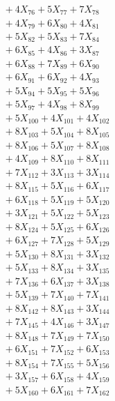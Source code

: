 \documentclass[a4paper,10pt]{article}
\begin{document}
{\begin{align}
&\;  + 4 X_{76} + 5 X_{77} + 7 X_{78} \\[0.3ex]
&\;  + 4 X_{79} + 6 X_{80} + 4 X_{81} \\[0.3ex]
&\;  + 5 X_{82} + 5 X_{83} + 7 X_{84} \\[0.3ex]
&\;  + 6 X_{85} + 4 X_{86} + 3 X_{87} \\[0.3ex]
&\;  + 6 X_{88} + 7 X_{89} + 6 X_{90} \\[0.3ex]
&\;  + 6 X_{91} + 6 X_{92} + 4 X_{93} \\[0.3ex]
&\;  + 5 X_{94} + 5 X_{95} + 5 X_{96} \\[0.3ex]
&\;  + 5 X_{97} + 4 X_{98} + 8 X_{99} \\[0.5ex]\allowbreak
&\;  + 5 X_{100} + 4 X_{101} + 4 X_{102} \\[0.3ex]
&\;  + 8 X_{103} + 5 X_{104} + 8 X_{105} \\[0.3ex]
&\;  + 8 X_{106} + 5 X_{107} + 8 X_{108} \\[0.3ex]
&\;  + 4 X_{109} + 8 X_{110} + 8 X_{111} \\[0.3ex]
&\;  + 7 X_{112} + 3 X_{113} + 3 X_{114} \\[0.3ex]
&\;  + 8 X_{115} + 5 X_{116} + 6 X_{117} \\[0.3ex]
&\;  + 6 X_{118} + 5 X_{119} + 5 X_{120} \\[0.3ex]
&\;  + 3 X_{121} + 5 X_{122} + 5 X_{123} \\[0.3ex]
&\;  + 8 X_{124} + 5 X_{125} + 6 X_{126} \\[0.3ex]
&\;  + 6 X_{127} + 7 X_{128} + 5 X_{129} \\[0.5ex]\allowbreak
&\;  + 5 X_{130} + 8 X_{131} + 3 X_{132} \\[0.3ex]
&\;  + 5 X_{133} + 8 X_{134} + 3 X_{135} \\[0.3ex]
&\;  + 7 X_{136} + 6 X_{137} + 3 X_{138} \\[0.3ex]
&\;  + 5 X_{139} + 7 X_{140} + 7 X_{141} \\[0.3ex]
&\;  + 8 X_{142} + 8 X_{143} + 3 X_{144} \\[0.3ex]
&\;  + 7 X_{145} + 4 X_{146} + 3 X_{147} \\[0.3ex]
&\;  + 8 X_{148} + 7 X_{149} + 7 X_{150} \\[0.3ex]
&\;  + 6 X_{151} + 7 X_{152} + 6 X_{153} \\[0.3ex]
&\;  + 8 X_{154} + 7 X_{155} + 5 X_{156} \\[0.3ex]
&\;  + 3 X_{157} + 6 X_{158} + 4 X_{159} \\[0.5ex]\allowbreak
&\;  + 5 X_{160} + 6 X_{161} + 7 X_{162} \\[0.3ex]

\end{align}}
\end{document}
